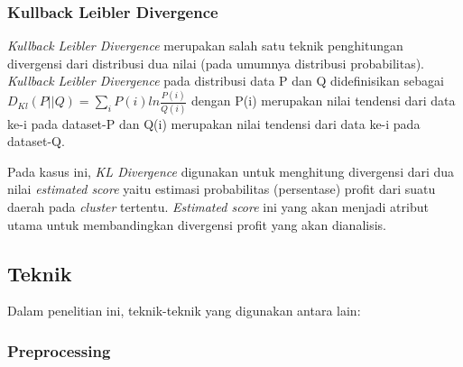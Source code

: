\documentclass{article}
\begin{document}
\subsubsection{Kullback Leibler Divergence}
\begin{adjustwidth}{4em}{0pt}
\hspace{\parindent}\textit{Kullback Leibler Divergence} merupakan salah satu teknik penghitungan divergensi dari distribusi dua nilai (pada umumnya distribusi probabilitas). \textit{Kullback Leibler Divergence} pada distribusi data  P dan Q  didefinisikan sebagai 
$D_{Kl}(P||Q) = \sum\limits_{i}P(i)ln\frac{P(i)}{Q(i)}$
dengan P(i) merupakan nilai tendensi dari data ke-i pada dataset-P dan Q(i) merupakan nilai tendensi dari data ke-i pada dataset-Q.

Pada kasus ini, \textit{KL Divergence} digunakan untuk menghitung divergensi dari dua nilai \textit{estimated score} yaitu estimasi probabilitas (persentase) profit dari suatu daerah pada \textit{cluster} tertentu. \textit{Estimated score} ini  yang akan menjadi atribut utama untuk membandingkan divergensi profit yang akan dianalisis.

\end{adjustwidth}

\subsection{Teknik}

\begin{adjustwidth}{2em}{0pt}

\hspace{\parindent}Dalam penelitian ini, teknik-teknik yang digunakan antara lain:

\end{adjustwidth}

\subsubsection{Preprocessing}
\end{document}
